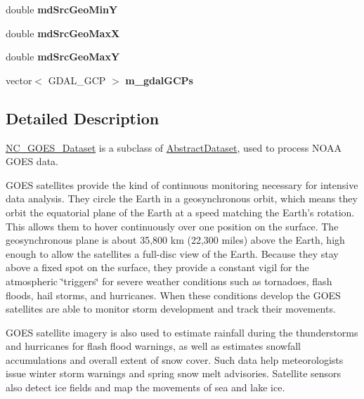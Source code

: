 \begin{DoxyCompactItemize}
\item 
\hypertarget{classNC__GOES__Dataset_a706dc5472f1f32bd949a00d7e6d0ff53}{
double {\bfseries mdSrcGeoMinY}}
\label{classNC__GOES__Dataset_a706dc5472f1f32bd949a00d7e6d0ff53}

\item 
\hypertarget{classNC__GOES__Dataset_a4d953ce0c73a23c4e7de48db31f1c486}{
double {\bfseries mdSrcGeoMaxX}}
\label{classNC__GOES__Dataset_a4d953ce0c73a23c4e7de48db31f1c486}

\item 
\hypertarget{classNC__GOES__Dataset_aea7c01d4ca66cad665f0f3b209b5b430}{
double {\bfseries mdSrcGeoMaxY}}
\label{classNC__GOES__Dataset_aea7c01d4ca66cad665f0f3b209b5b430}

\item 
\hypertarget{classNC__GOES__Dataset_a79fbf36f7e91c498b6d232c63a662be7}{
vector$<$ GDAL\_\-GCP $>$ {\bfseries m\_\-gdalGCPs}}
\label{classNC__GOES__Dataset_a79fbf36f7e91c498b6d232c63a662be7}

\end{DoxyCompactItemize}


\subsection{Detailed Description}
\hyperlink{classNC__GOES__Dataset}{NC\_\-GOES\_\-Dataset} is a subclass of \hyperlink{classAbstractDataset}{AbstractDataset}, used to process NOAA GOES data. 

GOES satellites provide the kind of continuous monitoring necessary for intensive data analysis. They circle the Earth in a geosynchronous orbit, which means they orbit the equatorial plane of the Earth at a speed matching the Earth's rotation. This allows them to hover continuously over one position on the surface. The geosynchronous plane is about 35,800 km (22,300 miles) above the Earth, high enough to allow the satellites a full-\/disc view of the Earth. Because they stay above a fixed spot on the surface, they provide a constant vigil for the atmospheric \char`\"{}triggers\char`\"{} for severe weather conditions such as tornadoes, flash floods, hail storms, and hurricanes. When these conditions develop the GOES satellites are able to monitor storm development and track their movements.

GOES satellite imagery is also used to estimate rainfall during the thunderstorms and hurricanes for flash flood warnings, as well as estimates snowfall accumulations and overall extent of snow cover. Such data help meteorologists issue winter storm warnings and spring snow melt advisories. Satellite sensors also detect ice fields and map the movements of sea and lake ice.


